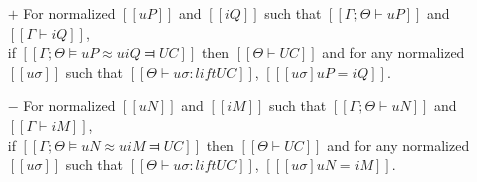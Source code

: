 \begin{lemma} \label{lemma:unification-soundness}
    \hfill
    \begin{itemize}
        \item [$+$] For normalized $[[uP]]$ and $[[iQ]]$ such that 
        $[[Γ ; Θ ⊢ uP]]$ and $[[Γ ⊢ iQ]]$,\\ 
        if $[[Γ ; Θ ⊨ uP ≈u iQ ⫤ UC]]$ then 
        $[[Θ ⊢ UC]]$ and for any normalized $[[uσ]]$ such that $[[Θ ⊢ uσ : lift UC]]$,
        $[[ [uσ]uP = iQ ]]$.

        \item [$-$] For normalized $[[uN]]$ and $[[iM]]$ such that
        $[[Γ ; Θ ⊢ uN]]$ and $[[Γ ⊢ iM]]$,\\
        if $[[Γ ; Θ ⊨ uN ≈u iM ⫤ UC]]$ then 
        $[[Θ ⊢ UC]]$ and for any normalized $[[uσ]]$ such that $[[Θ ⊢ uσ : lift UC]]$,
        $[[ [uσ]uN = iM ]]$.
    \end{itemize}
\end{lemma}

